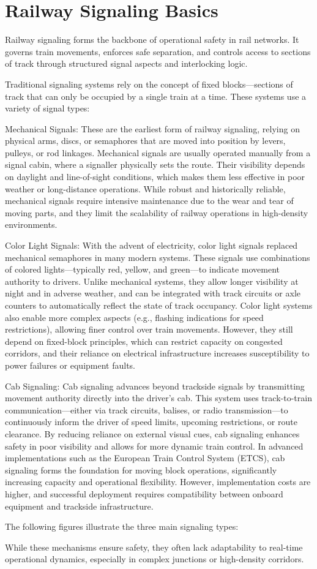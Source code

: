 \section{Railway Signaling Basics}

\label{sec:literature:signaling-basics}

Railway signaling forms the backbone of operational safety in rail networks. It governs train movements, enforces safe separation, and controls access to sections of track through structured signal aspects and interlocking logic.

Traditional signaling systems rely on the concept of fixed blocks—sections of track that can only be occupied by a single train at a time. These systems use a variety of signal types:

Mechanical Signals: These are the earliest form of railway signaling, relying on physical arms, discs, or semaphores that are moved into position by levers, pulleys, or rod linkages. Mechanical signals are usually operated manually from a signal cabin, where a signaller physically sets the route. Their visibility depends on daylight and line-of-sight conditions, which makes them less effective in poor weather or long-distance operations. While robust and historically reliable, mechanical signals require intensive maintenance due to the wear and tear of moving parts, and they limit the scalability of railway operations in high-density environments.

Color Light Signals: With the advent of electricity, color light signals replaced mechanical semaphores in many modern systems. These signals use combinations of colored lights—typically red, yellow, and green—to indicate movement authority to drivers. Unlike mechanical systems, they allow longer visibility at night and in adverse weather, and can be integrated with track circuits or axle counters to automatically reflect the state of track occupancy. Color light systems also enable more complex aspects (e.g., flashing indications for speed restrictions), allowing finer control over train movements. However, they still depend on fixed-block principles, which can restrict capacity on congested corridors, and their reliance on electrical infrastructure increases susceptibility to power failures or equipment faults.

Cab Signaling: Cab signaling advances beyond trackside signals by transmitting movement authority directly into the driver’s cab. This system uses track-to-train communication—either via track circuits, balises, or radio transmission—to continuously inform the driver of speed limits, upcoming restrictions, or route clearance. By reducing reliance on external visual cues, cab signaling enhances safety in poor visibility and allows for more dynamic train control. In advanced implementations such as the European Train Control System (ETCS), cab signaling forms the foundation for moving block operations, significantly increasing capacity and operational flexibility. However, implementation costs are higher, and successful deployment requires compatibility between onboard equipment and trackside infrastructure.

\noindent The following figures illustrate the three main signaling types:



While these mechanisms ensure safety, they often lack adaptability to real-time operational dynamics, especially in complex junctions or high-density corridors.